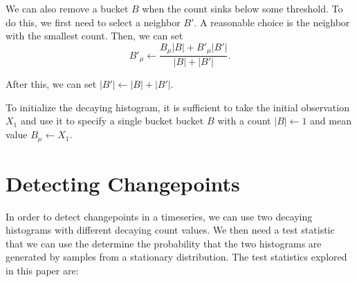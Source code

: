 \documentclass{sig-alternate}
\begin{document}
    We can also remove a bucket $B$ when the count sinks below some threshold.
    To do this, we first need to select a neighbor $B'$. A reasonable choice is
    the neighbor with the smallest count. Then, we can set
    \begin{displaymath}
        B'_{\mu} \leftarrow \frac{B_{\mu} |B| + B'_{\mu} |B'|}{|B| + |B'|}.
    \end{displaymath}

    After this, we can set $|B'| \leftarrow |B| + |B'|$.

    To initialize the decaying histogram, it is sufficient to take the initial
    observation $X_1$ and use it to specify a single bucket
    bucket $B$ with a count $|B| \leftarrow 1$ and mean value $B_{\mu}
    \leftarrow X_1$.

\section{Detecting Changepoints}
    In order to detect changepoints in a timeseries, we can use two decaying
    histograms with different decaying count values. We then need a test
    statistic that we can use the determine the probability that the two
    histograms are generated by samples from a stationary distribution. The test
    statistics explored in this paper are:
\end{document}

